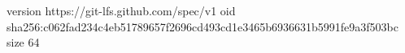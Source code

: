 version https://git-lfs.github.com/spec/v1
oid sha256:c062fad234c4eb51789657f2696cd493cd1e3465b6936631b5991fe9a3f503bc
size 64

